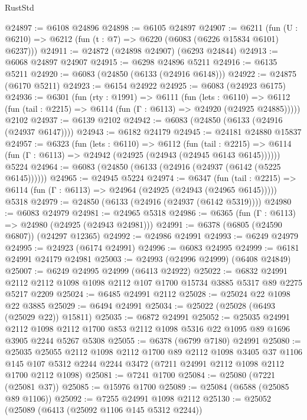 \begin{lexlean}{RustStd}
\begin{coremodule}
@24897 := @6108 @24896
@24898 := @6105 @24897
@24907 := @6211
    (fun (U : @6210) => @6212 (fun (t : @7) => @6220 (@6083 (@6226 @15834 @6101) @6237)))
@24911 := @24872 (@24898 @24907) (@6293 @24844)
@24913 := @6068 @24897 @24907
@24915 := @6298 @24896 @5211
@24916 := @6135 @5211
@24920 := @6083 (@24850 (@6133 (@24916 @6148)))
@24922 := @24875 (@6170 @5211)
@24923 := @6154 @24922
@24925 := @6083 (@24923 @6175)
@24936 := @6301
    (fun (rty : @1991) =>
    @6111
      (fun (lets : @6110) =>
      @6112 (fun (tail : @2215) => @6114 (fun (Γ : @6113) => @24920 (@24925 @24885)))))
    @2102
@24937 := @6139 @2102
@24942 := @6083 (@24850 (@6133 (@24916 (@24937 @6147))))
@24943 := @6182 @24179
@24945 := @24181 @24880 @15837
@24957 := @6323
    (fun (lets : @6110) =>
    @6112
      (fun (tail : @2215) =>
      @6114 (fun (Γ : @6113) => @24942 (@24925 (@24943 (@24945 @6143 @6145))))))
    @5224
@24964 := @6083 (@24850 (@6133 (@24916 (@24937 (@6142 (@5225 @6145))))))
@24965 := @24945 @5224
@24974 := @6347
    (fun (tail : @2215) => @6114 (fun (Γ : @6113) => @24964 (@24925 (@24943 (@24965 @6145)))))
    @5318
@24979 := @24850 (@6133 (@24916 (@24937 (@6142 @5319))))
@24980 := @6083 @24979
@24981 := @24965 @5318
@24986 := @6365 (fun (Γ : @6113) => @24980 (@24925 (@24943 @24981)))
@24991 := @6378 (@6805 (@24590 @6807)) (@24297 @12365)
@24992 := @24986 @24991
@24993 := @6249 @24979
@24995 := @24923 (@6174 @24991)
@24996 := @6083 @24995
@24999 := @6181 @24991 @24179 @24981
@25003 := @24993 (@24996 @24999) (@6408 @24849)
@25007 := @6249 @24995 @24999 (@6413 @24922)
@25022 := @6832
    @24991
    @2112
    @2112
    @1098
    @1098
    @2112
    @107
    @1700
    @15734
    @3885
    @5317
    @89
    @2275
    @5217
    @2209
@25024 := @6485 @24991 @2112
@25028 := @25024 @22 @1098 @22 @3885
@25029 := @6494 @24991
@25034 := @25022 (@25028 (@6493 (@25029 @22)) @15811)
@25035 := @6872 @24991
@25052 := @25035
    @24991
    @2112
    @1098
    @2112
    @1700
    @853
    @2112
    @1098
    @5316
    @22
    @1095
    @89
    @1696
    @3905
    @2244
    @5267
    @5308
@25055 := @6378 (@6799 @7180) @24991
@25080 := @25035
    @25055
    @2112
    @1098
    @2112
    @1700
    @89
    @2112
    @1098
    @3405
    @37
    @1106
    @145
    @107
    @5312
    @2244
    @2244
    @3472
    (@7211 @24991 @2112 @1098 @2112 @1700 @2112 @1098)
@25081 := @7241 @1700
@25084 := @25080 (@7221 (@25081 @37))
@25085 := @15976 @1700
@25089 := @25084 (@6588 (@25085 @89 @1106))
@25092 := @7255 @24991 @1098 @2112
@25130 := @25052
    (@25089
      (@6413 (@25092 @1106 @145 @5312 @2244))

\end{coremodule}
\end{lexlean}
